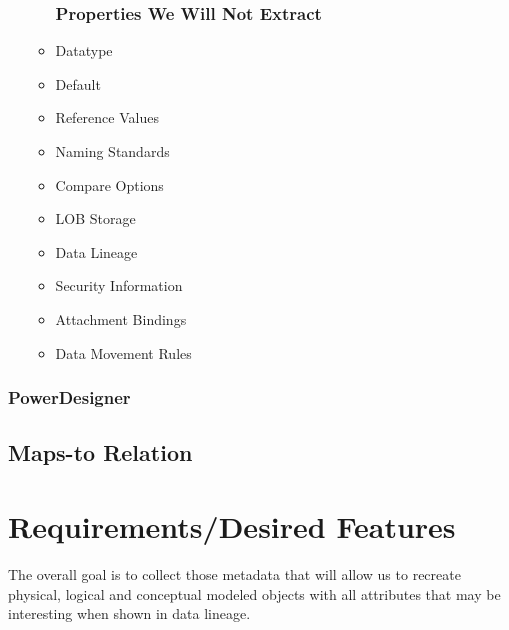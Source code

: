 \begin{itemize}
\begin{itemize}
		\subsubsection{Properties We Will Not Extract}
		\item Datatype
		\item Default
		\item Reference Values
		\item Naming Standards
		\item Compare Options
		\item LOB Storage
		\item Data Lineage
		\item Security Information
		\item Attachment Bindings
		\item Data Movement Rules
	\end{itemize}
\end{itemize}

\subsubsection{PowerDesigner}

\subsection{Maps-to Relation}

\section{Requirements/Desired Features}

The overall goal is to collect those metadata that will allow us to recreate physical, logical and conceptual modeled objects with all attributes that may be interesting when shown in data lineage.

